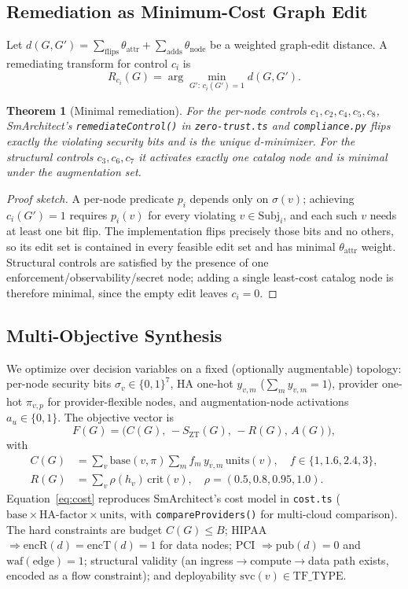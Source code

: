 \documentclass[journal]{IEEEtran}
\theoremstyle{plain}
\newtheorem{theorem}{Theorem}
\theoremstyle{definition}
\newcommand{\G}{G}
\newcommand{\Szt}{S_{\mathrm{ZT}}}
\newcommand{\Subj}{\mathrm{Subj}}
\newcommand{\pub}{\mathrm{pub}}
\newcommand{\code}[1]{\texttt{\small #1}}
\begin{document}
\subsection{Remediation as Minimum-Cost Graph Edit}
Let $d(\G,\G')=\sum_{\text{flips}}\theta_{\text{attr}}+\sum_{\text{adds}}\theta_{\text{node}}$
be a weighted graph-edit distance. A remediating transform for control $c_i$ is
\begin{equation}
R_{c_i}(\G)=\arg\min_{\G':\,c_i(\G')=1} d(\G,\G').
\label{eq:remediate}
\end{equation}
\begin{theorem}[Minimal remediation]\label{thm:remediation}
For the per-node controls $c_1,c_2,c_4,c_5,c_8$, SmArchitect's
\code{remediateControl()} in \code{zero-trust.ts} and \code{compliance.py}
flips exactly the violating security bits and is the unique $d$-minimizer. For
the structural controls $c_3,c_6,c_7$ it activates exactly one catalog node and
is minimal under the augmentation set.
\end{theorem}
\begin{proof}[Proof sketch]
A per-node predicate $p_i$ depends only on $\sigma(v)$; achieving $c_i(\G')=1$
requires $p_i(v)$ for every violating $v\in\Subj_i$, and each such $v$ needs at
least one bit flip. The implementation flips precisely those bits and no others,
so its edit set is contained in every feasible edit set and has minimal
$\theta_{\text{attr}}$ weight. Structural controls are satisfied by the presence
of one enforcement/observability/secret node; adding a single least-cost catalog
node is therefore minimal, since the empty edit leaves $c_i=0$.
\end{proof}

\subsection{Multi-Objective Synthesis}
We optimize over decision variables on a fixed (optionally augmentable)
topology: per-node security bits $\sigma_v\in\{0,1\}^7$, HA one-hot $y_{v,m}$
($\sum_m y_{v,m}=1$), provider one-hot $\pi_{v,p}$ for provider-flexible nodes,
and augmentation-node activations $a_u\in\{0,1\}$. The objective vector is
\begin{equation}
F(\G)=\big(C(\G),\,-\Szt(\G),\,-R(\G),\,A(\G)\big),
\label{eq:F}
\end{equation}
with
\begin{align}
C(\G)&=\sum_{v}\mathrm{base}(v,\pi)\sum_{m} f_m\,y_{v,m}\,\mathrm{units}(v),\quad f\in\{1,1.6,2.4,3\},\label{eq:cost}\\
R(\G)&=\sum_{v}\rho(h_v)\,\mathrm{crit}(v),\quad \rho=(0.5,0.8,0.95,1.0).\label{eq:resil}
\end{align}
Equation~\eqref{eq:cost} reproduces SmArchitect's cost model in
\code{cost.ts} ($\mathrm{base}\times\text{HA-factor}\times\text{units}$, with
\code{compareProviders()} for multi-cloud comparison). The hard constraints
are budget $C(\G)\le B$; HIPAA $\Rightarrow \text{encR}(d)=\text{encT}(d)=1$ for
data nodes; PCI $\Rightarrow \pub(d)=0$ and $\text{waf}(\text{edge})=1$;
structural validity (an ingress$\to$compute$\to$data path exists, encoded as a
flow constraint); and deployability $\mathrm{svc}(v)\in\mathrm{TF\_TYPE}$.
\end{document}
